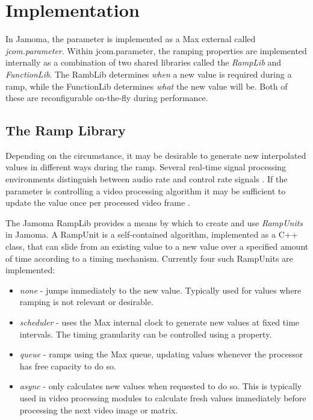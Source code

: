 \documentclass{article}
\begin{document}

\section{Implementation} %
\label{sec:param_implementation}

In Jamoma, the parameter is implemented as a Max external called \emph{jcom.parameter}. Within jcom.parameter, the ramping properties are implemented internally as a combination of two shared libraries called the \emph{RampLib} and \emph{FunctionLib}. The RambLib determines \emph{when} a new value is required during a ramp, while the FunctionLib determines \emph{what} the new value will be. Both of these are reconfigurable on-the-fly during performance.

\subsection{The Ramp Library} %
\label{ssec:ramplib}

Depending on the circumstance, it may be desirable to generate new interpolated values in different ways during the ramp. Several real-time signal processing environments distinguish between audio rate and control rate signals \cite{Boulanger:2000csound, McCartney:1996supercollider}. If the parameter is controlling a video processing algorithm it may be sufficient to update the value once per processed video frame \cite{Jones:2005jitter}.

The Jamoma RampLib provides a means by which to create and use \emph{RampUnits} in Jamoma.  A RampUnit is a self-contained algorithm, implemented as a C++ class, that can slide from an existing value to a new value over a specified amount of time according to a timing mechanism. Currently four such RampUnits are implemented:

\begin{itemize}
	\item \emph{none} - jumps immediately to the new value. Typically used for values where ramping is not relevant or desirable.
	\item \emph{scheduler} - uses the Max internal clock to generate new values at fixed time intervals. The timing granularity can be controlled using a property.
	\item \emph{queue} - ramps using the Max queue, updating values whenever the processor has free capacity to do so.
	\item \emph{async} - only calculates new values when requested to do so. This is typically used in video processing modules to calculate fresh values immediately before processing the next video image or matrix.
\end{itemize}
\end{document}
